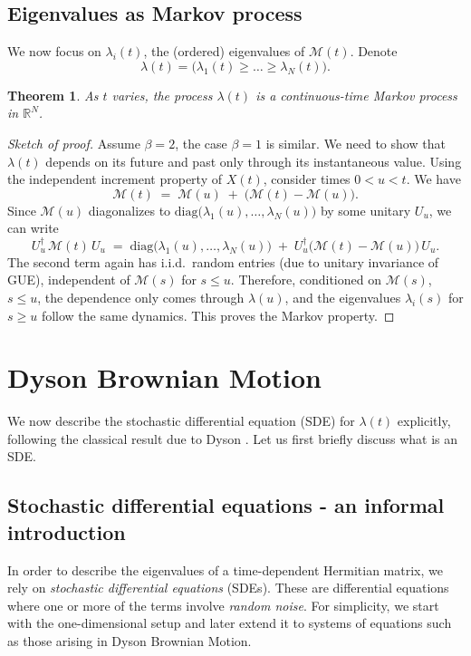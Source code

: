 \documentclass[letterpaper,11pt,oneside,reqno]{book}
\numberwithin{equation}{chapter}  %
\newtheorem{theorem}[proposition]{Theorem}
\theoremstyle{definition}
\begin{document}
\subsection{Eigenvalues as Markov process}
We now focus on $\lambda_i(t)$, the (ordered) eigenvalues of $\mathcal{M}(t)$. Denote
\[
\lambda(t) = \bigl(\lambda_1(t)\ge \dots \ge \lambda_N(t)\bigr).
\]
\begin{theorem}
\label{lecture10:thm:lambda_is_markov}
As $t$ varies, the process $\lambda(t)$ is a continuous-time Markov process in $\mathbb{R}^N$.
\end{theorem}
\begin{proof}[Sketch of proof]
	Assume $\beta=2$, the case $\beta=1$ is similar.
We need to show that $\lambda(t)$ depends on its future and past only through its instantaneous value. Using the independent increment property of $X(t)$, consider times $0< u< t$. We have
\[
\mathcal{M}(t) \;=\; \mathcal{M}(u)\;+\;\bigl(\mathcal{M}(t)-\mathcal{M}(u)\bigr).
\]
Since $\mathcal{M}(u)$ diagonalizes to $\mathrm{diag}\bigl(\lambda_1(u),\ldots,\lambda_N(u)\bigr)$ by some unitary $U_u$, we can write
\[
U_u^\dagger\,\mathcal{M}(t)\,U_u \;=\;\mathrm{diag}\bigl(\lambda_1(u),\ldots,\lambda_N(u)\bigr)\;+\; U_u^\dagger\bigl(\mathcal{M}(t)-\mathcal{M}(u)\bigr)\,U_u.
\]
The second term again has i.i.d.\ random entries (due to unitary invariance of
GUE), independent of $\mathcal{M}(s)$ for $s\le u$.
Therefore, conditioned on $\mathcal{M}(s)$, $s\le u$, the dependence only
comes through $\lambda(u)$, and the eigenvalues $\lambda_i(s)$ for $s\ge u$ follow
the same dynamics. This proves the Markov property.
\end{proof}

\section{Dyson Brownian Motion}
We now describe the stochastic differential equation (SDE)
for $\lambda(t)$ explicitly, following the classical result due to Dyson
\cite{dyson1962brownian}. Let us first briefly discuss what is an SDE.

\subsection{Stochastic differential equations - an informal introduction}

In order to describe the eigenvalues of a time-dependent Hermitian matrix, we rely on \emph{stochastic differential equations} (SDEs). These are differential equations where one or more of the terms involve \emph{random noise}. For simplicity, we start with the one-dimensional setup and later extend it to systems of equations such as those arising in Dyson Brownian Motion.
\end{document}
